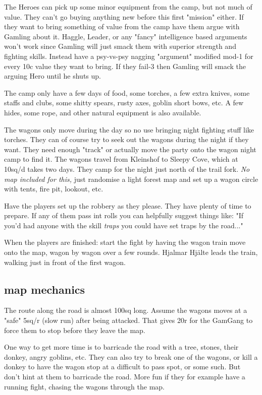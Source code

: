 The Heroes can pick up some minor equipment from the camp, but not much of value. They can't go buying anything new before this first "mission" either. If they want to bring something of value from the camp have them argue with Gamling about it. Haggle, Leader, or any "fancy" intelligence based arguments won't work since Gamling will just smack them with superior strength and fighting skills. Instead have a psy-vs-psy nagging "argument" modified mod-1 for every 10c value they want to bring. If they fail-3 then Gamling will smack the arguing Hero until he shuts up.

The camp only have a few days of food, some torches, a few extra knives, some staffs and clubs, some shitty spears, rusty axes, goblin short bows, etc. A few hides, some rope, and other natural equipment is also available.

The wagons only move during the day so no use bringing night fighting stuff like torches. They can of course try to seek out the wagons during the night if they want. They need enough "track" or actually move the party onto the wagon night camp to find it. The wagons travel from Kleinshof to Sleepy Cove, which at 10sq/d takes two days. They camp for the night just north of the trail fork. \emph{No map included for this,} just randomise a light forest map and set up a wagon circle with tents, fire pit, lookout, etc.

Have the players set up the robbery as they please. They have plenty of time to prepare. If any of them pass int rolls you can helpfully suggest things like: "If you'd had anyone with the skill \emph{traps} you could have set traps by the road..."

When the players are finished: start the fight by having the wagon train move onto the map, wagon by wagon over a few rounds. Hjalmar Hjälte leads the train, walking just in front of the first wagon.


\subsection*{map mechanics}

The route along the road is almost 100sq long. Assume the wagons moves at a "safe" 5sq/r (slow run) after being attacked. That gives 20r for the GamGang to force them to stop before they leave the map.

One way to get more time is to barricade the road with a tree, stones, their donkey, angry goblins, etc. They can also try to break one of the wagons, or kill a donkey to have the wagon stop at a difficult to pass spot, or some such. But don't hint at them to barricade the road. More fun if they for example have a running fight, chasing the wagons through the map.

